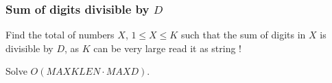 \subsubsection{Sum of digits divisible by $D$}

Find the total of numbers $X$, $1 \leq X \leq K$ such that the sum of digits in $X$ is divisible by $D$, as $K$ can be very large read it as string !

Solve $O(MAXKLEN \cdot MAXD)$.


